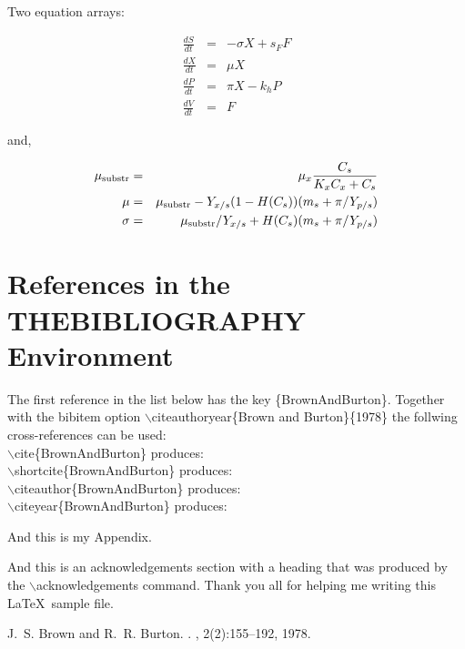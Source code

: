 \documentclass{kluwer}    %
\begin{document}
\begin{article}
Two equation arrays:

\begin{eqnarray}
  \frac{dS}{dt} & = & - \sigma X + s_{F} F\\
  \frac{dX}{dt} & = &   \mu    X\\
  \frac{dP}{dt} & = &   \pi    X - k_{h} P\\
  \frac{dV}{dt} & = &   F
\end{eqnarray}

and,

\begin{eqnarray}
 \mu_{\rm substr} & = & \mu_{x} \frac{C_{s}}{K_{x}C_{x}+C_{s}}  \\
 \mu              & = & \mu_{\rm substr} - Y_{x/s}(1-H(C_{s}))(m_{s}+\pi /Y_{p/s}) \\
 \sigma           & = & \mu_{\rm substr}/Y_{x/s}+ H(C_{s}) (m_{s}+ \pi /Y_{p/s})
\end{eqnarray}


\section{References in the THEBIBLIOGRAPHY Environment}
The first reference in the list below has the key \{BrownAndBurton\}.
Together with the bibitem option $\backslash$citeauthoryear\{Brown and
Burton\}\{1978\} the follwing cross-references can be used:\\
$\backslash$cite\{BrownAndBurton\} produces: \cite{BrownAndBurton}\\
$\backslash$shortcite\{BrownAndBurton\}  produces: \\  
$\backslash$citeauthor\{BrownAndBurton\}  produces: \citeauthor{BrownAndBurton}\\  
$\backslash$citeyear\{BrownAndBurton\}  produces: \citeyear{BrownAndBurton}\\  


\appendix

And this is my Appendix.


\acknowledgements
And this is an acknowledgements section with a heading that was produced by the
$\backslash$acknowledgements command. Thank you all for helping me writing this
\LaTeX\ sample file.


\theendnotes

\begin{thebibliography}{}

J.~S. Brown and R.~R. Burton.
.
, 2(2):155--192, 1978.


\end{thebibliography}
\end{article}
\end{document}
